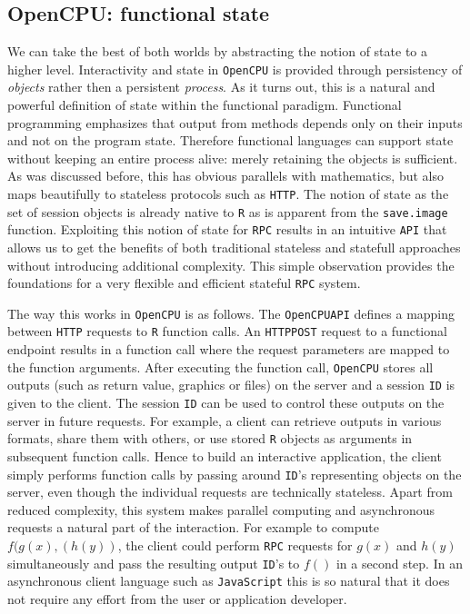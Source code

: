 \documentclass{article}
\newcommand{\R}{\texttt{R}\xspace}
\newcommand{\HTTP}{\texttt{HTTP}\xspace}
\newcommand{\API}{\texttt{API}\xspace}
\newcommand{\RPC}{\texttt{RPC}\xspace}
\newcommand{\ID}{\texttt{ID}\xspace}
\newcommand{\OpenCPU}{\texttt{OpenCPU}\xspace}
\begin{document}
\subsection{OpenCPU: functional state}

We can take the best of both worlds by abstracting the notion of state to a higher level. Interactivity and state in \OpenCPU is provided through persistency of \emph{objects} rather then a persistent \emph{process}. As it turns out, this is a natural and powerful definition of state within the functional paradigm. Functional programming emphasizes that output from methods depends only on their inputs and not on the program state. Therefore functional languages can support state without keeping an entire process alive: merely retaining the objects is sufficient. As was discussed before, this has obvious parallels with mathematics, but also maps beautifully to stateless protocols such as \HTTP. The notion of state as the set of session objects is already native to \R as is apparent from the \texttt{save.image} function. Exploiting this notion of state for \RPC results in an intuitive \API that allows us to get the benefits of both traditional stateless and statefull approaches without introducing additional complexity. This simple observation provides the foundations for a very flexible and efficient stateful \RPC system.

The way this works in \OpenCPU is as follows. The \OpenCPU \API defines a mapping between \HTTP requests to \R function calls. An \HTTP \texttt{POST} request to a functional endpoint results in a function call where the request parameters are mapped to the function arguments. After executing the function call, \OpenCPU stores all outputs (such as return value, graphics or files) on the server and a session \ID is given to the client. The session \ID can be used to control these outputs on the server in future requests. For example, a client can retrieve outputs in various formats, share them with others, or use stored \R objects as arguments in subsequent function calls. Hence to build an interactive application, the client simply performs function calls by passing around \ID's representing objects on the server, even though the individual requests are technically stateless. Apart from reduced complexity, this system makes parallel computing and asynchronous requests a natural part of the interaction. For example to compute $f(g(x),(h(y))$, the client could perform \RPC requests for $g(x)$ and $h(y)$ simultaneously and pass the resulting output \ID's to $f()$ in a second step. In an asynchronous client language such as \texttt{JavaScript} this is so natural that it does not require any effort from the user or application developer.
\end{document}
